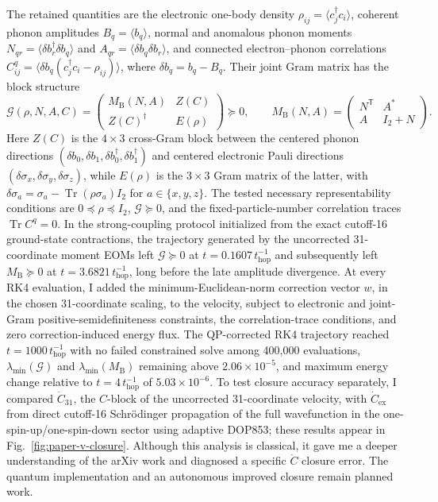 \documentclass[11pt]{article}
\begin{document}
The retained quantities are the electronic one-body density \(\rho_{ij}=\langle c_j^\dagger c_i\rangle\), coherent phonon amplitudes \(B_q=\langle b_q\rangle\), normal and anomalous phonon moments \(N_{qr}=\langle\delta b_r^\dagger\delta b_q\rangle\) and \(A_{qr}=\langle\delta b_q\delta b_r\rangle\), and connected electron--phonon correlations \(C^q_{ij}=\langle\delta b_q(c_j^\dagger c_i-\rho_{ij})\rangle\), where \(\delta b_q=b_q-B_q\). Their joint Gram matrix has the block structure
\[
\mathcal G(\rho,N,A,C)=
\begin{pmatrix}
M_{\mathrm B}(N,A)&Z(C)\\
Z(C)^\dagger&E(\rho)
\end{pmatrix}\succeq0,
\qquad
M_{\mathrm B}(N,A)=
\begin{pmatrix}
N^{\mathsf T}&A^*\\
A&I_2+N
\end{pmatrix}.
\]
Here \(Z(C)\) is the \(4\times3\) cross-Gram block between the centered phonon directions \((\delta b_0,\delta b_1,\delta b_0^\dagger,\delta b_1^\dagger)\) and centered electronic Pauli directions \((\delta\sigma_x,\delta\sigma_y,\delta\sigma_z)\), while \(E(\rho)\) is the \(3\times3\) Gram matrix of the latter, with \(\delta\sigma_a=\sigma_a-\operatorname{Tr}(\rho\sigma_a)I_2\) for \(a\in\{x,y,z\}\). The tested necessary representability conditions are \(0\preceq\rho\preceq I_2\), \(\mathcal G\succeq0\), and the fixed-particle-number correlation traces \(\operatorname{Tr}C^q=0\). In the strong-coupling protocol initialized from the exact cutoff-16 ground-state contractions, the trajectory generated by the uncorrected 31-coordinate moment EOMs left \(\mathcal G\succeq0\) at \(t=0.1607\,t_{\mathrm{hop}}^{-1}\) and subsequently left \(M_{\mathrm B}\succeq0\) at \(t=3.6821\,t_{\mathrm{hop}}^{-1}\), long before the late amplitude divergence. At every RK4 evaluation, I added the minimum-Euclidean-norm correction vector \(w\), in the chosen 31-coordinate scaling, to the velocity, subject to electronic and joint-Gram positive-semidefiniteness constraints, the correlation-trace conditions, and zero correction-induced energy flux. The QP-corrected RK4 trajectory reached \(t=1000\,t_{\mathrm{hop}}^{-1}\) with no failed constrained solve among 400,000 evaluations, \(\lambda_{\min}(\mathcal G)\) and \(\lambda_{\min}(M_{\mathrm B})\) remaining above \(2.06\times10^{-5}\), and maximum energy change relative to \(t=4\,t_{\mathrm{hop}}^{-1}\) of \(5.03\times10^{-6}\). To test closure accuracy separately, I compared \(\dot C_{31}\), the \(C\)-block of the uncorrected 31-coordinate velocity, with \(\dot C_{\mathrm{ex}}\) from direct cutoff-16 Schr\"odinger propagation of the full wavefunction in the one-spin-up/one-spin-down sector using adaptive DOP853; these results appear in Fig.~\ref{fig:paper-v-closure}. Although this analysis is classical, it gave me a deeper understanding of the arXiv work and diagnosed a specific \(\dot C\) closure error. The quantum implementation and an autonomous improved closure remain planned work.
\end{document}
